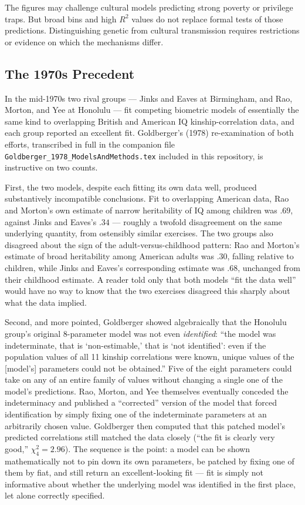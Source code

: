 \documentclass[12pt]{article}
\begin{document}
The figures may challenge cultural models predicting strong poverty or
privilege traps. But broad bins and high $R^2$ values do not replace
formal tests of those predictions. Distinguishing genetic from cultural
transmission requires restrictions or evidence on which the mechanisms
differ.

\subsection{The 1970s Precedent}
\label{sec:1970s-precedent}

In the mid-1970s two rival groups --- Jinks and Eaves at Birmingham, and Rao,
Morton, and Yee at Honolulu --- fit competing biometric models of essentially
the same kind to overlapping British and American IQ kinship-correlation
data, and each group reported an excellent fit. Goldberger's (1978)
re-examination of both efforts, transcribed in full in the companion file
\texttt{Goldberger\_1978\_ModelsAndMethods.tex} included in this repository,
is instructive on two counts.

First, the two models, despite each fitting its own data well, produced
substantively incompatible conclusions. Fit to overlapping American data,
Rao and Morton's own estimate of narrow heritability of IQ among children was
$.69$, against Jinks and Eaves's $.34$ --- roughly a twofold disagreement on
the same underlying quantity, from ostensibly similar exercises. The two
groups also disagreed about the sign of the adult-versus-childhood pattern:
Rao and Morton's estimate of broad heritability among American adults was
$.30$, falling relative to children, while Jinks and Eaves's corresponding
estimate was $.68$, unchanged from their childhood estimate. A reader told
only that both models ``fit the data well'' would have no way to know that
the two exercises disagreed this sharply about what the data implied.

Second, and more pointed, Goldberger showed algebraically that the Honolulu
group's original 8-parameter model was not even \emph{identified}: ``the
model was indeterminate, that is `non-estimable,' that is `not identified':
even if the population values of all 11 kinship correlations were known,
unique values of the [model's] parameters could not be obtained.'' Five of
the eight parameters could take on any of an entire family of values without
changing a single one of the model's predictions. Rao, Morton, and Yee
themselves eventually conceded the indeterminacy and published a
``corrected'' version of the model that forced identification by simply
fixing one of the indeterminate parameters at an arbitrarily chosen value.
Goldberger then computed that this patched model's predicted correlations
still matched the data closely (``the fit is clearly very good,''
$\chi^2_4=2.96$). The sequence is the point: a model can be shown
mathematically not to pin down its own parameters, be patched by fixing one
of them by fiat, and still return an excellent-looking fit --- fit is simply
not informative about whether the underlying model was identified in the
first place, let alone correctly specified.
\end{document}
